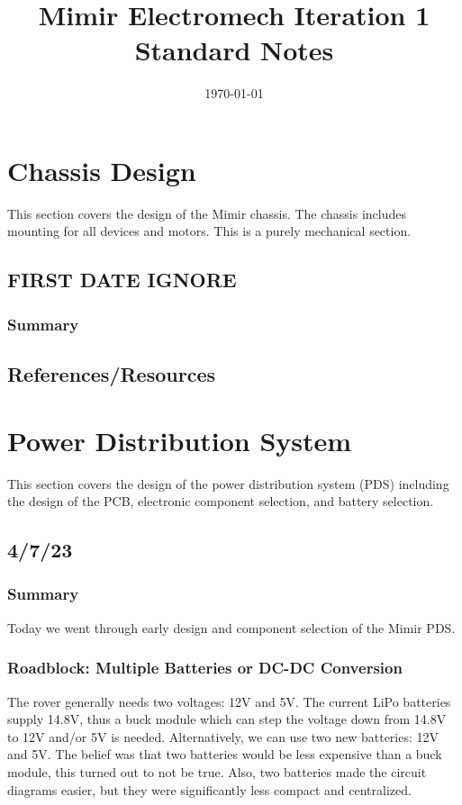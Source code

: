 \documentclass[a4paper, 10pt]{article}
\title{Mimir Electromech Iteration 1 Standard Notes}
\date{\today}
\begin{document}
\maketitle

\pagebreak

\tableofcontents

\pagebreak

\section{Chassis Design}
This section covers the design of the Mimir chassis. The chassis includes mounting for all devices and motors. This is a purely mechanical section. 

	\subsection{FIRST DATE IGNORE}
		\subsubsection{Summary}
		
	\subsection{References/Resources}
	
\section{Power Distribution System}
This section covers the design of the power distribution system (PDS) including the design of the PCB, electronic component selection, and battery selection. 

	\subsection{4/7/23}
		\subsubsection{Summary}
		Today we went through early design and component selection of the Mimir PDS. 
		
		\subsubsection{Roadblock: Multiple Batteries or DC-DC Conversion}
		The rover generally needs two voltages: 12V and 5V. The current LiPo batteries supply 14.8V, thus a buck module which can step the voltage down from 14.8V to 12V and/or 5V is needed. Alternatively, we can use two new batteries: 12V and 5V. The belief was that two batteries would be less expensive than a buck module, this turned out to not be true. Also, two batteries made the circuit diagrams easier, but they were significantly less compact and centralized.
		
\end{document}
